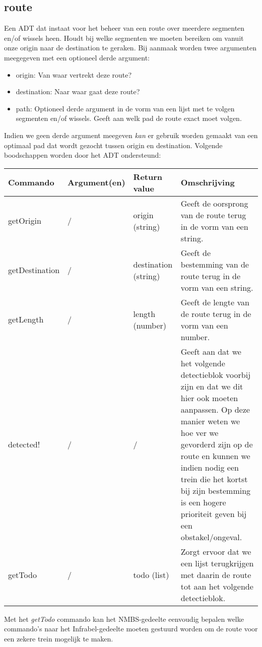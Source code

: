 \documentclass{article}
\begin{document}
\subsection{route} %
Een ADT dat instaat voor het beheer van een route over meerdere segmenten en/of wissels heen. Houdt bij welke segmenten we moeten bereiken om vanuit onze origin naar de destination te geraken. Bij aanmaak worden twee argumenten meegegeven met een optioneel derde argument:
\begin{itemize}
  \item origin: Van waar vertrekt deze route?
  \item destination: Naar waar gaat deze route?
  \item path: Optioneel derde argument in de vorm van een lijst met te volgen segmenten en/of wissels. Geeft aan welk pad de route exact moet volgen.
\end{itemize}
Indien we geen derde argument meegeven \textit{kan} er gebruik worden gemaakt van een optimaal pad dat wordt gezocht tussen origin en destination.
Volgende boodschappen worden door het ADT ondersteund:
\begin{center}
    \begin{tabular}{ | l | l | l | p{8cm} |}
    \hline
    Commando & Argument(en) & Return value & Omschrijving \\ \hline
    getOrigin & / & origin (string) & Geeft de oorsprong van de route terug in de vorm van een string. \\ \hline
    getDestination & / & destination (string) & Geeft de bestemming van de route terug in de vorm van een string. \\ \hline
    getLength & / & length (number) & Geeft de lengte van de route terug in de vorm van een number. \\ \hline
    detected! & / & / & Geeft aan dat we het volgende detectieblok voorbij zijn en dat we dit hier ook moeten aanpassen. Op deze manier weten we hoe ver we gevorderd zijn op de route en kunnen we indien nodig een trein die het kortst bij zijn bestemming is een hogere prioriteit geven bij een obstakel/ongeval. \\ \hline
    getTodo & / & todo (list) & Zorgt ervoor dat we een lijst terugkrijgen met daarin de route tot aan het volgende detectieblok. \\ \hline
    \end{tabular}
\end{center}

\noindent Met het \textit{getTodo} commando kan het NMBS-gedeelte eenvoudig bepalen welke commando's naar het Infrabel-gedeelte moeten gestuurd worden om de route voor een zekere trein mogelijk te maken.
\end{document}

